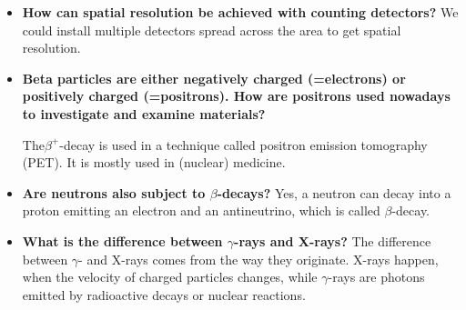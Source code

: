 \begin{itemize}
	\item \textbf{How can spatial resolution be achieved with
		counting detectors?}
	We could install multiple detectors spread across the area to get spatial resolution.
	
	\item \textbf{Beta particles are either negatively charged
		(=electrons) or positively charged (=positrons).
		How are positrons used nowadays to investigate
		and examine materials?}
	
	The$\beta^+$-decay is used in a technique called positron emission tomography (PET). It is mostly used in (nuclear) medicine.
	
	\item \textbf{Are neutrons also subject to $\beta$-decays?}
	Yes, a neutron can decay into a proton emitting an electron and an antineutrino, which is called $\beta$-decay. 

	\item \textbf{What is the difference between $\gamma$-rays and X-rays?}
	The difference between $\gamma$- and X-rays comes from the way they originate.
	X-rays happen, when the velocity of charged particles changes, while $\gamma$-rays are photons emitted by radioactive decays or nuclear reactions.

\end{itemize}
